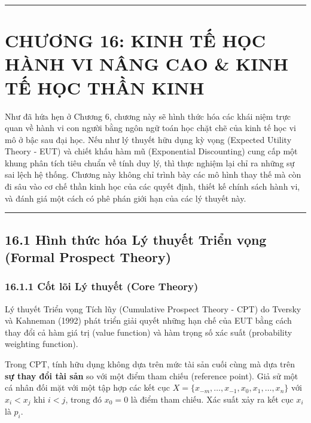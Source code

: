 \documentclass[
]{article}
\begin{document}
\begin{center}\rule{0.5\linewidth}{0.5pt}\end{center}

\section{CHƯƠNG 16: KINH TẾ HỌC HÀNH VI NÂNG CAO \& KINH TẾ HỌC THẦN
KINH}\label{chux1b0ux1a1ng-16-kinh-tux1ebf-hux1ecdc-huxe0nh-vi-nuxe2ng-cao-kinh-tux1ebf-hux1ecdc-thux1ea7n-kinh}

Như đã hứa hẹn ở Chương 6, chương này sẽ hình thức hóa các khái niệm
trực quan về hành vi con người bằng ngôn ngữ toán học chặt chẽ của kinh
tế học vi mô ở bậc sau đại học. Nếu như lý thuyết hữu dụng kỳ vọng
(Expected Utility Theory - EUT) và chiết khấu hàm mũ (Exponential
Discounting) cung cấp một khung phân tích tiêu chuẩn về tính duy lý, thì
thực nghiệm lại chỉ ra những sự sai lệch hệ thống. Chương này không chỉ
trình bày các mô hình thay thế mà còn đi sâu vào cơ chế thần kinh học
của các quyết định, thiết kế chính sách hành vi, và đánh giá một cách có
phê phán giới hạn của các lý thuyết này.

\begin{center}\rule{0.5\linewidth}{0.5pt}\end{center}

\subsection{16.1 Hình thức hóa Lý thuyết Triển vọng (Formal Prospect
Theory)}\label{huxecnh-thux1ee9c-huxf3a-luxfd-thuyux1ebft-triux1ec3n-vux1ecdng-formal-prospect-theory}

\subsubsection{16.1.1 Cốt lõi Lý thuyết (Core
Theory)}\label{cux1ed1t-luxf5i-luxfd-thuyux1ebft-core-theory-60}

Lý thuyết Triển vọng Tích lũy (Cumulative Prospect Theory - CPT) do
Tversky và Kahneman (1992) phát triển giải quyết những hạn chế của EUT
bằng cách thay đổi cả hàm giá trị (value function) và hàm trọng số xác
suất (probability weighting function).

Trong CPT, tính hữu dụng không dựa trên mức tài sản cuối cùng mà dựa
trên \textbf{sự thay đổi tài sản} so với một điểm tham chiếu (reference
point). Giả sử một cá nhân đối mặt với một tập hợp các kết cục
\(X = \{x_{-m}, \dots, x_{-1}, x_0, x_1, \dots, x_n\}\) với
\(x_i < x_j\) khi \(i < j\), trong đó \(x_0 = 0\) là điểm tham chiếu.
Xác suất xảy ra kết cục \(x_i\) là \(p_i\).
\end{document}
